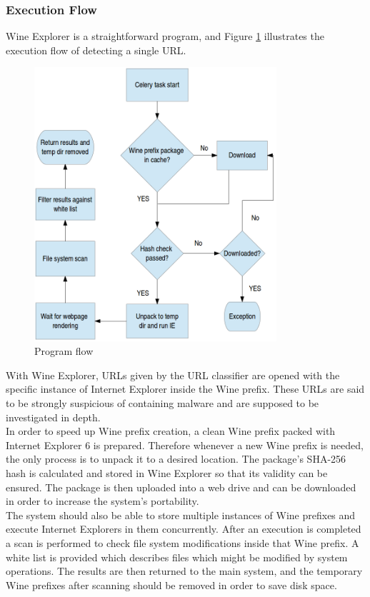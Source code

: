 \subsubsection{Execution Flow}
Wine Explorer is a straightforward program, and Figure \ref{fig:wine}
illustrates the execution flow of detecting a single URL. \\
\begin{figure}[htb]
\centering
\includegraphics[width=0.8\textwidth]{img/wine-flowchart.png}
\caption{Program flow}
\label{fig:wine}
\end{figure}
With Wine Explorer, URLs given by the URL classifier are opened with the specific instance of Internet Explorer inside the Wine 
prefix. 
These URLs are said to be strongly suspicious of containing malware and are 
supposed to be investigated in depth. \\
In order to speed up Wine prefix creation, a clean Wine prefix packed with 
Internet Explorer 6 is prepared. Therefore whenever a new Wine prefix is needed, 
the only process is to unpack it to a desired location. 
The package's SHA-256 hash is calculated and stored in Wine Explorer so that 
its validity can be ensured. 
The package is then uploaded into a web drive and can be downloaded in 
order to increase the system's portability. \\
The system should also be able to store multiple instances of Wine prefixes 
and execute Internet Explorers in them concurrently. 
After an execution is completed a scan is performed to check file system 
modifications inside that Wine prefix. 
A white list is provided which describes files which might be modified by
system operations. 
The results are then returned to the main system, and the temporary Wine 
prefixes after scanning should be removed in order to save disk space. 

